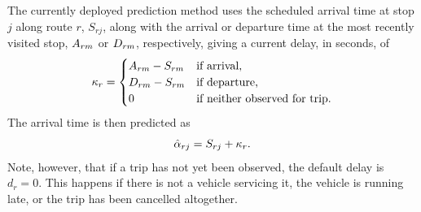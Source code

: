 The currently deployed prediction method uses the scheduled arrival time at stop $j$ along route $r$, $S_{rj}$, along with the arrival or departure time at the most recently visited stop, $A_{rm}$ or $D_{rm}$, respectively, giving a current delay, in seconds, of
\begin{equation}
\label{eq:sched_cur_delay}
\kappa_{r} =
\begin{cases}
A_{rm} - S_{rm} & \text{if arrival,} \\
D_{rm} - S_{rm} & \text{if departure,} \\
0 & \text{if neither observed for trip.}
\end{cases}
\end{equation}
The arrival time is then predicted as
\begin{equation}
\label{eq:sched_pred_arr}
\hat{\alpha}_{rj} = S_{rj} + \kappa_r.
\end{equation}
Note, however, that if a trip has not yet been observed, the default delay is $d_r = 0$. This happens if there is not a vehicle servicing it, the vehicle is running late, or the trip has been cancelled altogether.
